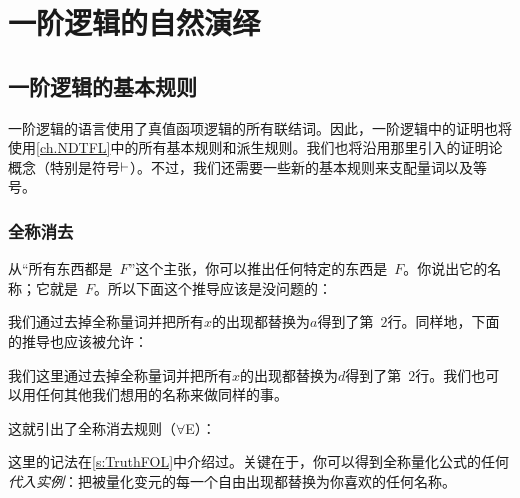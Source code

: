 \part{一阶逻辑的自然演绎}
\label{ch.NDFOL}

\chapter{一阶逻辑的基本规则}\label{s:BasicFOL}

一阶逻辑的语言使用了真值函项逻辑的所有联结词。因此，一阶逻辑中的证明也将使用\cref{ch.NDTFL}中的所有基本规则和派生规则。我们也将沿用那里引入的证明论概念（特别是符号$\vdash$）。不过，我们还需要一些新的基本规则来支配量词以及等号。

\section{全称消去}\label{s:forallElim}

从“所有东西都是~$F$”这个主张，你可以推出任何特定的东西是~$F$。你说出它的名称；它就是~$F$。所以下面这个推导应该是没问题的：


\begin{fitchproof}
	\PR
	 
\end{fitchproof}


我们通过去掉全称量词并把所有$x$的出现都替换为$a$得到了第~$2$行。同样地，下面的推导也应该被允许：


\begin{fitchproof}
	\PR
	 
\end{fitchproof}


我们这里通过去掉全称量词并把所有$x$的出现都替换为$d$得到了第~$2$行。我们也可以用任何其他我们想用的名称来做同样的事。

这就引出了全称消去规则（$\forall$E）：


这里的记法在\cref{s:TruthFOL}中介绍过。关键在于，你可以得到全称量化公式的任何\emph{代入实例}：把被量化变元的每一个自由出现都替换为你喜欢的任何名称。

